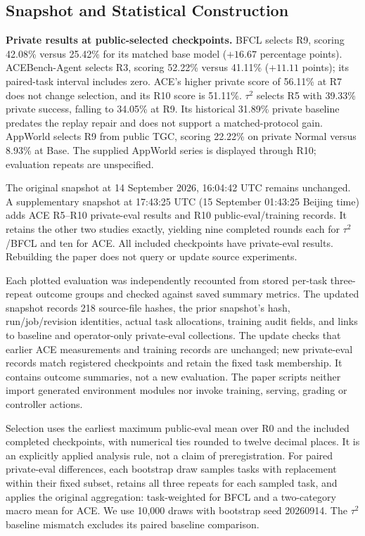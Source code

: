 \subsection{Snapshot and Statistical Construction}

\textbf{Private results at public-selected checkpoints.}\quad
BFCL selects R9, scoring 42.08\% versus 25.42\% for its matched base model
($+16.67$ percentage points). ACEBench-Agent selects R3, scoring 52.22\%
versus 41.11\% ($+11.11$ points); its paired-task interval includes zero.
ACE's higher private score of 56.11\% at R7 does not change selection, and
its R10 score is 51.11\%. $\tau^2$ selects R5 with 39.33\% private success,
falling to 34.05\% at R9. Its historical 31.89\% private baseline predates
the replay repair and does not support a matched-protocol gain.
AppWorld selects R9 from public TGC, scoring 22.22\% on private Normal versus
8.93\% at Base. The supplied AppWorld series is displayed through R10;
evaluation repeats are unspecified.

The original snapshot at 14 September 2026, 16:04:42 UTC remains unchanged. A supplementary snapshot at 17:43:25 UTC (15 September 01:43:25 Beijing time) adds ACE R5--R10 private-eval results and R10 public-eval/training records. It retains the other two studies exactly, yielding nine completed rounds each for $\tau^2$/BFCL and ten for ACE. All included checkpoints have private-eval results. Rebuilding the paper does not query or update source experiments.

Each plotted evaluation was independently recounted from stored per-task three-repeat outcome groups and checked against saved summary metrics. The updated snapshot records 218 source-file hashes, the prior snapshot's hash, run/job/revision identities, actual task allocations, training audit fields, and links to baseline and operator-only private-eval collections. The update checks that earlier ACE measurements and training records are unchanged; new private-eval records match registered checkpoints and retain the fixed task membership. It contains outcome summaries, not a new evaluation. The paper scripts neither import generated environment modules nor invoke training, serving, grading or controller actions.

Selection uses the earliest maximum public-eval mean over R0 and the included completed checkpoints, with numerical ties rounded to twelve decimal places. It is an explicitly applied analysis rule, not a claim of preregistration. For paired private-eval differences, each bootstrap draw samples tasks with replacement within their fixed subset, retains all three repeats for each sampled task, and applies the original aggregation: task-weighted for BFCL and a two-category macro mean for ACE. We use 10,000 draws with bootstrap seed 20260914. The $\tau^2$ baseline mismatch excludes its paired baseline comparison.

